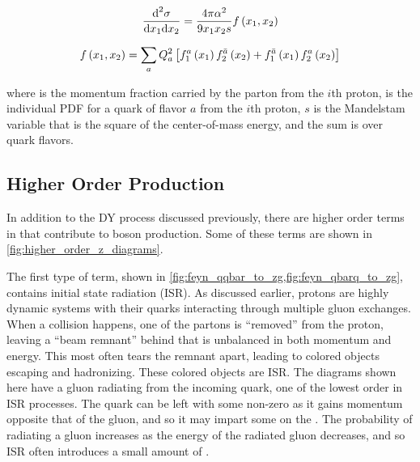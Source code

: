 \begin{equation}\label{eq:drell_yan_cross_section}
    \frac{\text{d}^{2}\sigma}
    {\text{d}x_{1} \text{d}x_{2}}
    =
    \frac{4 \pi \alpha^{2}}
    {9 x_{1} x_{2} s}
    f \left( x_{1}, x_{2} \right)
\end{equation}

\begin{equation}\label{eq:fx}
    f \left( x_{1}, x_{2} \right)
    =
    \sum_{a}
    Q^{2}_{a}
    \left[
        f^{a}_{1} \left( x_{1} \right)
        f^{\bar{a}}_{2} \left( x_{2} \right)
        +
        f^{\bar{a}}_{1} \left( x_{1} \right)
        f^{a}_{2} \left( x_{2} \right)
    \right]
\end{equation}

where  is the momentum fraction carried by the parton from the
$i$th proton,  is the individual PDF for a quark of
flavor $a$ from the $i$th proton, $s$ is the Mandelstam variable that is
the square of the center-of-mass energy, and the sum is over quark flavors.



\subsection{Higher Order Production}
\label{ssec:higher_order}

In addition to the DY process discussed previously, there are higher order
terms in \alphastrong that contribute to \Z boson production. Some of these
terms are shown in \cref{fig:higher_order_z_diagrams}.

The first type of term, shown in
\cref{fig:feyn_qqbar_to_zg,fig:feyn_qbarq_to_zg}, contains initial state
radiation (ISR). As discussed earlier, protons are highly dynamic systems with
their quarks interacting through multiple gluon exchanges. When a collision
happens, one of the partons is ``removed'' from the proton, leaving a ``beam
remnant'' behind that is unbalanced in both momentum and energy. This most
often tears the remnant apart, leading to colored objects escaping and
hadronizing. These colored objects are ISR. The diagrams shown here have a
gluon radiating from the incoming quark, one of the lowest order in
\alphastrong ISR processes. The quark can be left with some non-zero \pt as it
gains momentum opposite that of the gluon, and so it may impart some \bosonpt
on the \Z. The probability of radiating a gluon increases as the energy of the
radiated gluon decreases, and so ISR often introduces a small amount of
\bosonpt.

